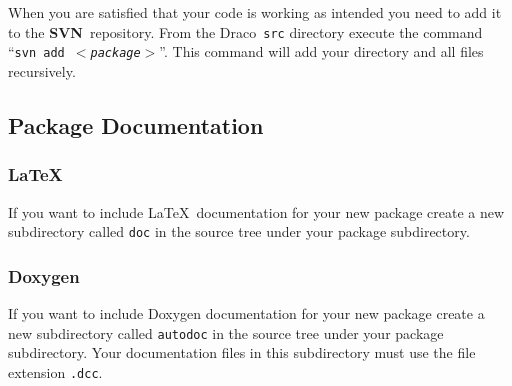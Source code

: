 \documentclass[11pt]{nmemo}
\newcommand{\comp}[1]{\normalfont\footnotesize\texttt{#1}\normalsize}
\newcommand{\draco}{{\normalfont\sffamily Draco}}
\newcommand{\svn}{{\normalfont\bfseries SVN}}
\begin{document}
When you are satisfied that your code is working as intended you need
to add it to the \svn\ repository.  From the \draco\ \comp{src}
directory execute the command ``\comp{svn add $<$\emph{package}$>$}''.
This command will add your directory and all files recursively.


\subsection{Package Documentation}

\subsubsection{\LaTeX} 
If you want to include \LaTeX\ documentation for your new package
create a new subdirectory called \comp{doc} in the source tree under
your package subdirectory.


\subsubsection{Doxygen}
If you want to include Doxygen documentation for your new package
create a new subdirectory called \comp{autodoc} in the source tree
under your package subdirectory.  Your documentation files in this
subdirectory must use the file extension \comp{.dcc}.
\end{document}
